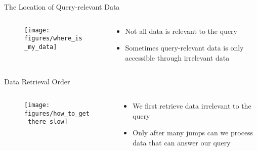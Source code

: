 \begin{frame}{The Location of Query-relevant Data}
    \begin{columns}[T] %
        \begin{column}{.48\textwidth}

       \begin{figure}
            \centering
            \texttt{[image: figures/where\_is\_my\_data]}
        \end{figure}

        \end{column}%
        \hfill%
        \begin{column}{.48\textwidth}
            \bigskip
            \begin{itemize}
                \item Not all data is relevant to the query
                \item Sometimes query-relevant data is only accessible through irrelevant data
            \end{itemize}
        \end{column}%
    \end{columns}
\end{frame}

\begin{frame}{Data Retrieval Order}
    \begin{columns}[T] %
        \begin{column}{.48\textwidth}

       \begin{figure}
            \centering
            \texttt{[image: figures/how\_to\_get\_there\_slow]}
        \end{figure}

        \end{column}%
        \hfill%
        \begin{column}{.48\textwidth}
            \bigskip
            \begin{itemize}
                \item We first retrieve data irrelevant to the query
                \item Only after many jumps can we process data that can answer our query
            \end{itemize}
        \end{column}%
    \end{columns}
\end{frame}


